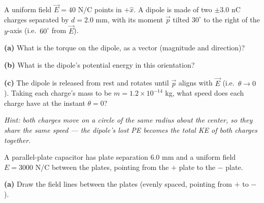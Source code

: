 \documentclass[12pt]{article}
\begin{document}


\prob A uniform field $\vec E = 40$ N/C points in $+\hat x$. A dipole is made of two
$\pm3.0$ nC charges separated by $d=2.0$ mm, with its moment $\vec p$ tilted
$30^\circ$ to the right of the $y$-axis (i.e.\ $60^\circ$ from $\vec E$).

\begin{center}
\end{center}

\textbf{(a)} What is the torque on the dipole, as a vector (magnitude and direction)?


\textbf{(b)} What is the dipole's potential energy in this orientation?


\textbf{(c)} The dipole is released from rest and rotates until $\vec p$ aligns with
$\vec E$ (i.e.\ $\theta\to0$). Taking each charge's mass to be $m=1.2\times10^{-14}$
kg, what speed does each charge have at the instant $\theta=0$?

\textit{Hint: both charges move on a circle of the same radius about the center, so
they share the same speed --- the dipole's lost PE becomes the total KE of both
charges together.}


\clearpage

\prob A parallel-plate capacitor has plate separation $6.0$ mm and a uniform field
$E=3000$ N/C between the plates, pointing from the $+$ plate to the $-$ plate.

\textbf{(a)} Draw the field lines between the plates (evenly spaced, pointing from
$+$ to $-$).
\end{document}
